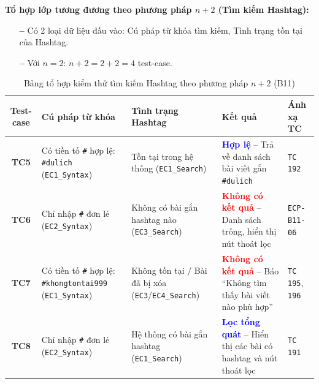 \documentclass[11pt,a4paper]{article}
\begin{document}
\noindent\textbf{Tổ hợp lớp tương đương theo phương pháp $n+2$ (Tìm kiếm Hashtag):}
\begin{itemize}[leftmargin=1.2cm, noitemsep]
    \item[\textbf{--}] Có 2 loại dữ liệu đầu vào: Cú pháp từ khóa tìm kiếm, Tình trạng tồn tại của Hashtag.
    \item[\textbf{--}] Với $n = 2$: $n + 2 = 2 + 2 = 4$ test-case.
\end{itemize}
\begin{table}[H]
\centering
\small
\begin{tabularx}{\textwidth}{|c|X|X|L{3.8cm}|C{2.1cm}|}
\hline
{}
\textbf{Test-case} & \textbf{Cú pháp từ khóa} & \textbf{Tình trạng Hashtag} & \textbf{Kết quả} & \textbf{Ánh xạ TC} \tabularnewline
\hline
\textbf{TC5} & Có tiền tố \texttt{\#} hợp lệ: \texttt{\#dulich} (\texttt{EC1\_Syntax}) & Tồn tại trong hệ thống (\texttt{EC1\_Search}) & \textcolor{blue}{\textbf{Hợp lệ}} -- Trả về danh sách bài viết gắn \texttt{\#dulich} & \texttt{TC 192} \\ \hline
\textbf{TC6} & Chỉ nhập \texttt{\#} đơn lẻ (\texttt{EC2\_Syntax}) & Không có bài gắn hashtag nào (\texttt{EC3\_Search}) & \textcolor{red}{\textbf{Không có kết quả}} -- Danh sách trống, hiển thị nút thoát lọc & \texttt{ECP-B11-06} \\ \hline
\textbf{TC7} & Có tiền tố \texttt{\#} hợp lệ: \texttt{\#khongtontai999} (\texttt{EC1\_Syntax}) & Không tồn tại / Bài đã bị xóa (\texttt{EC3}/\texttt{EC4\_Search}) & \textcolor{red}{\textbf{Không có kết quả}} -- Báo ``Không tìm thấy bài viết nào phù hợp'' & \texttt{TC 195}, \texttt{196} \\ \hline
\textbf{TC8} & Chỉ nhập \texttt{\#} đơn lẻ (\texttt{EC2\_Syntax}) & Hệ thống có bài gắn hashtag (\texttt{EC1\_Search}) & \textcolor{blue}{\textbf{Lọc tổng quát}} -- Hiển thị các bài có hashtag và nút thoát lọc & \texttt{TC 191} \\ \hline
\end{tabularx}
\caption{Bảng tổ hợp kiểm thử tìm kiếm Hashtag theo phương pháp $n+2$ (B11)}
\end{table}
\end{document}
